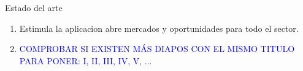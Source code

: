 \documentclass[10pt,spanish,xcolor={svgnames}]{beamer}
\begin{document}
\begin{frame}{Estado del arte}
{\begin{center}
\begin{enumerate}
			\item Estimula la aplicacion \Rightarrow abre mercados y oportunidades para todo el sector.
			\vspace{1.5em}	
            
			\item \textcolor{blue}{COMPROBAR SI EXISTEN MÁS DIAPOS CON EL MISMO TITULO PARA PONER: I, II, III, IV, V, ...}
			\vspace{1.5em}	
			\vfill
		\end{enumerate}
        \end{center}}
\end{frame}
\end{document}
